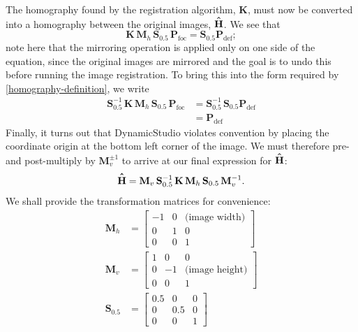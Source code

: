 \documentclass[11.5pt]{book}
\newcommand*{\Hhat}{\hat{\vphantom{\scalebox{1.2}{H}} H}}
\begin{document}
The homography found by the registration algorithm, $\mathbf{K}$, must now be
converted into a homography between the original images, $\mathbf{\Hhat}$. We
see that
\begin{equation}
    \mathbf{K}\, \mathbf{M}_h\, \mathbf{S}_{0.5}\, \mathbf{P}_\text{foc} =
    \mathbf{S}_{0.5} \mathbf{P}_\text{def};
\end{equation}
note here that the mirroring operation is applied only on one side of the
equation, since the original images are mirrored and the goal is to undo this
before running the image registration. To bring this into the form required by
\eqref{homography-definition}, we write
\begin{align}
    \mathbf{S}_{0.5}^{-1}\, \mathbf{K}\, \mathbf{M}_h\, \mathbf{S}_{0.5}\,
    \mathbf{P}_\text{foc} &=
     \mathbf{S}_{0.5}^{-1}\, \mathbf{S}_{0.5} \mathbf{P}_\text{def} \\
     &= \mathbf{P}_\text{def}
 \end{align}
Finally, it turns out that DynamicStudio violates convention by placing the
coordinate origin at the bottom left corner of the image. We must therefore 
pre- and post-multiply by $\mathbf{M}_v^{\pm 1}$ to arrive at our final
expression for $\mathbf{\Hhat}$:
\begin{equation}
    \mathbf{\Hhat} = \mathbf{M}_v\, \mathbf{S}_{0.5}^{-1}\, \mathbf{K}\,
    \mathbf{M}_h\, \mathbf{S}_{0.5}\, \mathbf{M}_v^{-1}.
\end{equation}
We shall provide the transformation matrices for convenience:
\begin{align}
    \mathbf{M}_h &= \left[ \begin{array}{ccc}
    -1 & 0 & \text{(image width)} \\
            0 & 1 & 0 \\
            0 & 0 & 1
    \end{array} \right] \\
    \mathbf{M}_v &= \left[ \begin{array}{ccc}
            1 & 0 & 0 \\
    0 & -1 & \text{(image height)} \\
            0 & 0 & 1
    \end{array} \right] \\
    \mathbf{S}_{0.5} &= \left[ \begin{array}{ccc}
            0.5 & 0 & 0 \\
    0 & 0.5 & 0 \\
            0 & 0 & 1
    \end{array} \right]
\end{align}
  
\end{document}
